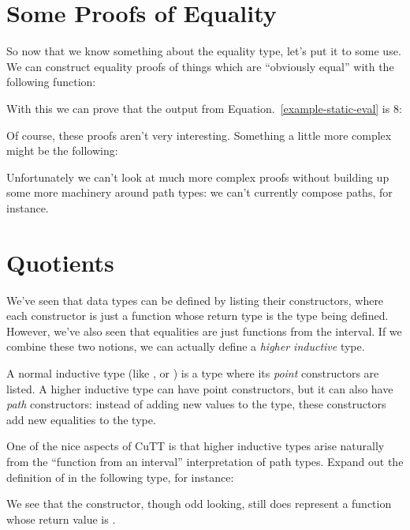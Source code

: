 \section{Some Proofs of Equality}
So now that we know something about the equality type, let's put it to some use.
We can construct equality proofs of things which are ``obviously equal'' with
the following function:
\begin{agdalisting}
\end{agdalisting}
With this we can prove that the output from Equation.~\ref{example-static-eval}
is 8:
\begin{agdalisting*}
\end{agdalisting*}

Of course, these proofs aren't very interesting.
Something a little more complex might be the following:
\begin{agdalisting*}
\end{agdalisting*}
Unfortunately we can't look at much more complex proofs without building up some
more machinery around path types: we can't currently compose paths, for
instance.
\section{Quotients}
We've seen that data types can be defined by listing their constructors, where
each constructor is just a function whose return type is the type being defined.
However, we've also seen that equalities are just functions from the interval.
If we combine these two notions, we can actually define a \emph{higher
  inductive} type.
\begin{definition}
  A normal inductive type (like , or ) is a type
  where its \emph{point} constructors are listed.
  A higher inductive type can have point constructors, but it can also have
  \emph{path} constructors: instead of adding new values to the type, these
  constructors add new equalities to the type.
\end{definition}

One of the nice aspects of CuTT is that higher inductive types arise naturally
from the ``function from an interval'' interpretation of path types.
Expand out the definition of \AgdaFunction{\(\equiv\)} in the following type,
for instance:
\begin{agdalisting}
\end{agdalisting}
We see that the  constructor, though odd looking,
still does represent a function whose return value is
.

